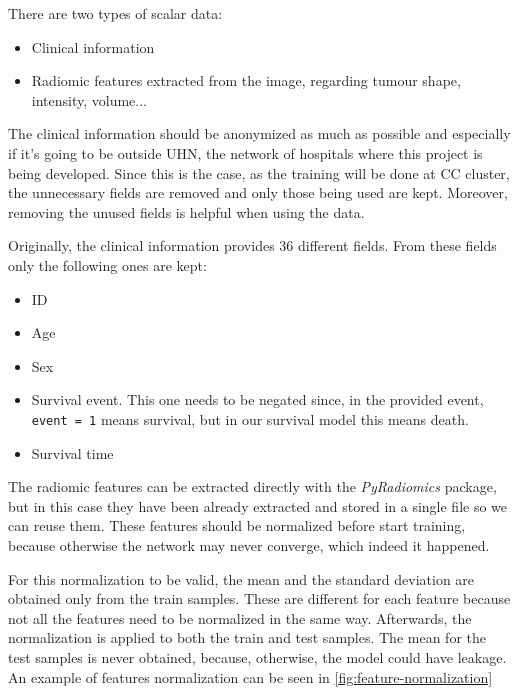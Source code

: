
There are two types of scalar data:
\begin{itemize}
  \item Clinical information
  \item Radiomic features extracted from the image, regarding tumour shape, intensity, volume...
\end{itemize}

The clinical information should be anonymized as much as possible and especially if it's going
to be outside \gls{UHN}, the network of hospitals where this project is being developed.
Since this is the case, as the training will be done at \gls{CC} cluster, the unnecessary fields
are removed and only those being used are kept. Moreover, removing the unused fields
is helpful when using the data.

Originally, the clinical information provides 36 different fields. From these fields only the 
following ones are kept:
\begin{itemize}
  \item ID
  \item Age
  \item Sex
  \item Survival event. This one needs to be negated since, in the provided event, \verb|event = 1|
        means survival, but in our survival model this means death. 
  \item Survival time
\end{itemize}

The radiomic features can be extracted directly with the \emph{PyRadiomics}
\cite{medical:py-radiomics} package, but in this case they have been already extracted and stored
in a single file so we can reuse them. These features should be normalized before start training,
because otherwise the network may never converge, which indeed it happened. 

For this normalization to be valid, the mean and the standard deviation are obtained only from 
the train samples. These are different for each feature because not all the features need to 
be normalized in the same way. Afterwards, the normalization is applied to both the train 
and test samples. The mean for the test samples is never obtained, because, otherwise, the
model could have \gls{leakage}. An example of features normalization can be seen in
\autoref{fig:feature-normalization}

